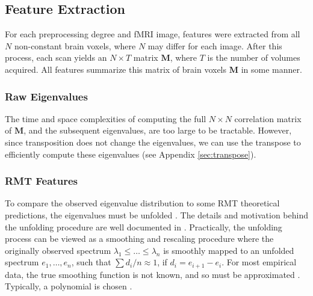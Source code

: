 \documentclass[12pt]{spieman}  %
\begin{document}
\begin{spacing}{2}
\subsection{Feature Extraction}


For each preprocessing degree and fMRI image, features were extracted from all
\(N\) non-constant brain voxels, where \(N\) may differ for each image. After
this process, each scan yields an \(N \times T\) matrix \(\mathbf{M}\), where
\(T\) is the number of volumes acquired. All features summarize this matrix
of brain voxels \(\mathbf{M}\) in some manner.

\subsubsection{Raw Eigenvalues}
\label{sec:raw-eigs}

The time and space complexities of computing the full \(N \times N\) correlation
matrix of \(\mathbf{M}\), and the subsequent eigenvalues, are too large to be
tractable. However, since transposition does not change the eigenvalues, we
can use the transpose to efficiently compute these eigenvalues (see
Appendix \ref{sec:transpose}).




\subsubsection{RMT Features}
\label{sec:rmt-features}


To compare the observed eigenvalue distribution to some RMT theoretical
predictions, the eigenvalues must be unfolded
\cite{guhrRandommatrixTheoriesQuantum1998a,mehtaRandomMatrices2004}. The
details and motivation behind the unfolding procedure are well documented in
\cite{guhrRandommatrixTheoriesQuantum1998a}. Practically, the unfolding process
can be viewed as a smoothing and rescaling procedure where the originally
observed spectrum \(\lambda_1 \le \dots \le \lambda_n\) is smoothly mapped to
an unfolded spectrum \(e_1, \dots, e_n\), such that \(\sum d_i/n \approx 1\),
if \(d_i = e_{i+1} - e_i \). For most empirical data, the true smoothing
function is not known, and so must be approximated
\cite{guhrRandommatrixTheoriesQuantum1998a,mehtaRandomMatrices2004}. Typically,
a polynomial is chosen \cite{abul-magdUnfoldingSpectrumChaotic2014}.


\end{spacing}
\end{document}
